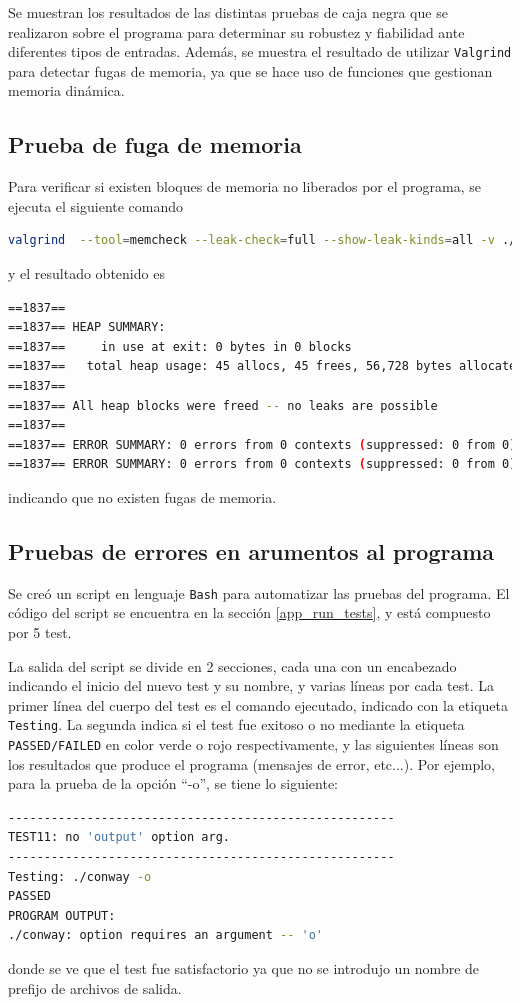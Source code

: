 \documentclass[a4paper,12pt]{article}
\newcommand{\quotes}[1]{``#1''}
\numberwithin{equation}{section}
\numberwithin{figure}{section}
\begin{document}
Se muestran los resultados de las distintas pruebas de caja negra que se realizaron sobre el programa para determinar su robustez y fiabilidad ante diferentes tipos de entradas. Además, se muestra el resultado de utilizar \texttt{Valgrind} para detectar fugas de memoria, ya que se hace uso de funciones que gestionan memoria dinámica.

\subsection{Prueba de fuga de memoria}

Para verificar si existen bloques de memoria no liberados por el programa, se ejecuta el siguiente comando
\begin{lstlisting}[language=bash, style=StyleC]
valgrind  --tool=memcheck --leak-check=full --show-leak-kinds=all -v ./conway 10 20 20 glider -o estado
\end{lstlisting}
y el resultado obtenido es
\begin{lstlisting}[language=bash, style=StyleC]
==1837== 
==1837== HEAP SUMMARY:
==1837==     in use at exit: 0 bytes in 0 blocks
==1837==   total heap usage: 45 allocs, 45 frees, 56,728 bytes allocated
==1837== 
==1837== All heap blocks were freed -- no leaks are possible
==1837== 
==1837== ERROR SUMMARY: 0 errors from 0 contexts (suppressed: 0 from 0)
==1837== ERROR SUMMARY: 0 errors from 0 contexts (suppressed: 0 from 0)
\end{lstlisting}
indicando que no existen fugas de memoria.




\subsection{Pruebas de errores en arumentos al programa}

Se creó un script en lenguaje \texttt{Bash} para automatizar las pruebas del programa.  El código del script se encuentra en la sección \ref{app_run_tests}, y está compuesto por 5 test.

La salida del script se divide en 2 secciones, cada una con un encabezado indicando el inicio del nuevo test y su nombre, y varias líneas por cada test. La primer línea del cuerpo del test es el comando ejecutado, indicado con la etiqueta \texttt{Testing}. La segunda indica si el test fue exitoso o no mediante la etiqueta \texttt{PASSED/FAILED} en color verde o rojo respectivamente, y las siguientes líneas son los resultados que produce el programa (mensajes de error, etc...). Por ejemplo, para la prueba de la opción \quotes{-o}, se tiene lo siguiente:
\begin{lstlisting}[language=bash, style=StyleC]
------------------------------------------------------
TEST11: no 'output' option arg.
------------------------------------------------------
Testing: ./conway -o
PASSED
PROGRAM OUTPUT:
./conway: option requires an argument -- 'o'
\end{lstlisting}
donde se ve que el test fue satisfactorio ya que no se introdujo un nombre de prefijo de archivos de salida.
\end{document}
